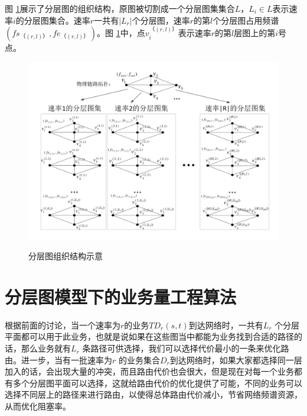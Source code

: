 图 \ref{layer}展示了分层图的组织结构，原图被切割成一个分层图集集合$L$，$L_i \in L$表示速率$i$的分层图集合。速率$r$一共有$|L_r|$个分层图，速率$r$的第$l$个分层图占用频谱$(fs_{（ (r,l) ）},fe_{（ (r,l) ）})$。图 \ref{layer}中，点$v_i^{（ (r,l) ）}$表示速率$r$的第$l$层图上的第$i$号点。
\begin{figure}
\setlength{\abovecaptionskip}{-0.5cm}
\begin{center}
{\includegraphics[width=1 \textwidth]{figures/LAYER.pdf}}
\end{center}
\caption{{\footnotesize{分层图组织结构示意}}}
\label{layer}
\end{figure}
\section{分层图模型下的业务量工程算法}
根据前面的讨论，当一个速率为$r$的业务$TD_r(s,t)$到达网络时，一共有$L_r$ 个分层平面都可以用于此业务，也就是说如果在这些图当中都能为业务找到合适的路径的话，那么业务就有$L_r$ 条路径可供选择，我们可以选择代价最小的一条来优化路由。进一步，当有一批速率为$r$ 的业务集合$D_r$到达网络时，如果大家都选择同一层加入的话，会出现大量的冲突，而且路由代价也会很大，但是现在对每一个业务都有多个分层图平面可以选择，这就给路由代价的优化提供了可能，不同的业务可以选择不同层上的路径来进行路由，以使得总体路由代价减小，节省网络频谱资源，从而优化阻塞率。

